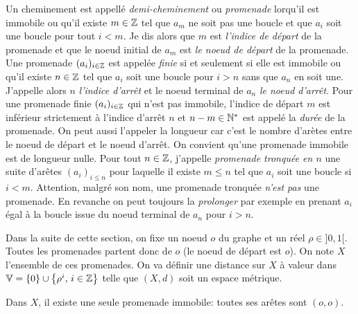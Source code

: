  
\noindent Un cheminement est appellé \emph{demi-cheminement} ou \emph{promenade} lorqu'il est immobile ou qu'il existe $m\in\mathbb{Z}$ tel que $a_m$ ne soit pas une boucle et que $a_i$ soit une boucle pour tout $i<m$. Je dis alors que $m$ est \emph{l'indice de départ} de la promenade et que le noeud initial de $a_m$ est \emph{le noeud de départ} de la promenade.\newline
Une promenade $(a_i)_{i\in \mathbb{Z}}$ est appelée \emph{finie} si et seulement si elle est immobile ou qu'il existe $n \in \mathbb{Z}$ tel que $a_i$ soit une boucle pour $i>n$ sans que $a_n$ en soit une. J'appelle alors $n$ \emph{l'indice d'arrêt} et le noeud terminal de $a_n$ \emph{le noeud d'arrêt}.\newline
Pour une promenade finie $(a_i)_{i\in \mathbb{Z}}$ qui n'est pas immobile, l'indice de départ $m$ est inférieur strictement à l'indice d'arrêt $n$ et $n-m \in \mathbb{N}^*$ est appelé la \emph{durée} de la promenade. On peut aussi l'appeler la longueur car c'est le nombre d'arètes entre le noeud de départ et le noeud d'arrêt. On convient qu'une promenade immobile est de longueur nulle.\newline
Pour tout $n\in \mathbb{Z}$, j'appelle \emph{promenade tronquée en $n$}  une suite d'arêtes $(a_i)_{i\leq n}$ pour laquelle il existe $m\leq n$ tel que $a_i$ soit une boucle si $i<m$. Attention, malgré son nom, une promenade tronquée \emph{n'est pas} une promenade. En revanche on peut toujours la \emph{prolonger} par exemple en prenant $a_i$ égal à la boucle issue du noeud terminal de $a_n$ pour $i>n$.

Dans la suite de cette section, on fixe un noeud $o$ du graphe et un réel $\rho \in ]0,1[$. Toutes les promenades partent donc de $o$ (le noeud de départ est $o$). On note $X$ l'ensemble de ces promenades. On va définir une distance sur $X$ à valeur dans $\mathbb{V} = \{0 \}\cup \left\lbrace \rho^i,\, i \in \mathbb{Z} \right\rbrace$ telle que $(X,d)$ soit un espace métrique.
\begin{rem}
 Dans $X$, il existe une seule promenade immobile: toutes ses arêtes sont $(o,o)$.
\end{rem}

